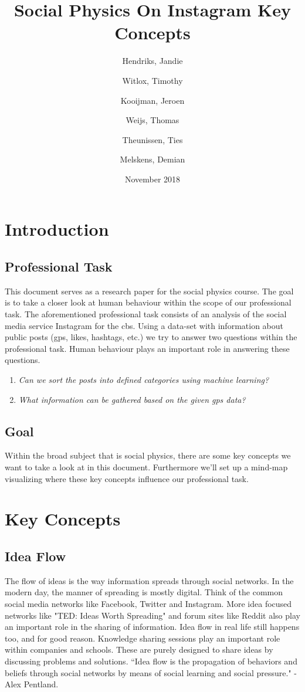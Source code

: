 \documentclass{article}
\title{Social Physics On Instagram Key Concepts}
\author{
  Hendriks, Jandie\\
  \and
  Witlox, Timothy\\
  \and
  Kooijman, Jeroen\\
  \and
  Weijs, Thomas\\
  \and
  Theunissen, Ties\\
  \and
  Melskens, Demian\\
}
\date{November 2018}
\begin{document}
\maketitle
{}
\pagebreak
\tableofcontents
\pagebreak
{}
\section{Introduction}
\subsection{Professional Task}
This document serves as a research paper for the social physics course. The goal is to take a closer look at human behaviour within the scope of our professional task. The aforementioned professional task consists of an analysis of the social media service Instagram for the \gls{cbs}. Using a data-set with information about public posts (\gls{gps}, likes, hashtags, etc.) we try to answer two questions within the professional task. Human behaviour plays an important role in answering these questions. 
\begin{enumerate}
	\item \textit{Can we sort the posts into defined categories using machine learning?}
	\item \textit{What information can be gathered based on the given \gls{gps} data?}
\end{enumerate}
\subsection{Goal}
Within the broad subject that is social physics, there are some key concepts we want to take a look at in this document. Furthermore we'll set up a mind-map visualizing where these key concepts influence our professional task. 

\pagebreak

\section{Key Concepts}
\subsection{Idea Flow}
The flow of ideas is the way information spreads through social networks. In the modern day, the manner of spreading is mostly digital. Think of the common social media networks like Facebook, Twitter and Instagram. More idea focused networks like "TED: Ideas Worth Spreading" and forum sites like Reddit also play an important role in the sharing of information. Idea flow in real life still happens too, and for good reason. Knowledge sharing sessions play an important role within companies and schools. These are purely designed to share ideas by discussing problems and solutions. ``Idea flow is the propagation of behaviors and beliefs through social networks by means of social learning and social pressure." -Alex Pentland.
\end{document}
